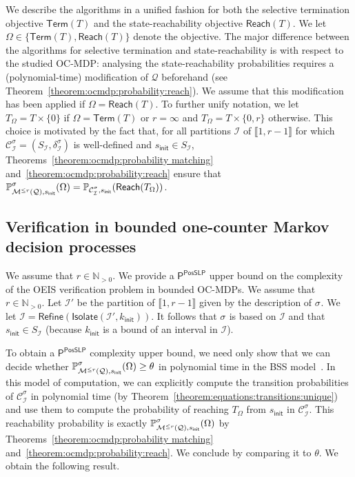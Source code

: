 \documentclass[a4paper,UKenglish,cleveref,autoref,thm-restate,colorlinks]{lipics-v2021}
\newcommand{\init}{\mathsf{init}}
\newcommand{\integerInterval}[1]{\llbracket{}#1\rrbracket{}}
\newcommand{\ptime}{\textsf{P}}
\newcommand{\posSLP}{\textsf{PosSLP}}
\newcommand{\IN}{\mathbb{N}}
\newcommand{\INpos}{\IN_{>0}}
\newcommand{\mdp}{\mathcal{M}}
\newcommand{\mdpStateSpace}{S}
\newcommand{\mdpTrans}{\delta}
\newcommand{\ocmdp}{\mathcal{Q}}
\newcommand{\ocmdpFin}[2]{\mdp^{\leq #2}(#1)}
\newcommand{\ocCount}{k}
\newcommand{\ocConfig}{s}
\newcommand{\counterUB}{r}
\newcommand{\mchain}{\mathcal{C}}
\newcommand{\intPart}{\mathcal{I}}
\newcommand{\compressChainStrat}[1]{\mchain^{#1}_{\intPart}}
\newcommand{\compressChain}{\compressChainStrat{\strat}}
\newcommand{\compressChainStateSpace}{\mdpStateSpace_{\intPart}}
\newcommand{\compressChainTransTemplate}[2]{\mdpTrans^{#1}_{#2}}
\newcommand{\compressChainTrans}{\compressChainTransTemplate{\strat}{\intPart}}
\newcommand{\objective}{\Omega}
\newcommand{\reach}[1]{\mathsf{Reach}(#1)}
\newcommand{\target}{T}
\newcommand{\termination}{\mathsf{Term}}
\newcommand{\selectiveTermination}[1]{\termination({#1})}
\newcommand{\thresProba}{\theta}
\newcommand{\stratGeneric}[1]{{\sigma_{#1}}}
\newcommand{\strat}{\stratGeneric{}}
\begin{document}
We describe the algorithms in a unified fashion for both the selective termination objective $\selectiveTermination{\target}$ and the state-reachability objective $\reach{\target}$.
We let $\objective\in\{\selectiveTermination{\target}, \reach{\target}\}$ denote the objective.
The major difference between the algorithms for selective termination and state-reachability is with respect to the studied OC-MDP: analysing the state-reachability probabilities requires a (polynomial-time) modification of $\ocmdp$ beforehand (see Theorem~\ref{theorem:ocmdp:probability:reach}).
We assume that this modification has been applied if $\objective=\reach{\target}$.
To further unify notation, we let $\target_\objective = \target\times\{0\}$ if $\objective=\selectiveTermination{\target}$ or $\counterUB=\infty$ and $\target_\objective=\target\times\{0, \counterUB\}$ otherwise.
This choice is motivated by the fact that, for all partitions $\intPart$ of $\integerInterval{1, \counterUB-1}$ for which $\compressChain=(\compressChainStateSpace, \compressChainTrans)$ is well-defined and $\ocConfig_\init\in\compressChainStateSpace$, Theorems~\ref{theorem:ocmdp:probability matching} and~\ref{theorem:ocmdp:probability:reach} ensure that $\probaGverb{\ocmdpFin{\ocmdp}{\counterUB}}{\ocConfig_\init}{\strat}(\objective)=\probaMCverb{\compressChain}{\ocConfig_\init}(\reach{\target_\objective})$.

\subsection{Verification in bounded one-counter Markov decision processes}\label{section:verification:algorithms:bounded}
We assume that $\counterUB\in\INpos$.
We provide a $\ptime^{\posSLP}$ upper bound on the complexity of the OEIS verification problem in bounded OC-MDPs.
We assume that $\counterUB\in\INpos$.
Let $\intPart'$ be the partition of $\integerInterval{1, \counterUB-1}$ given by the description of $\strat$.
We let $\intPart = \mathsf{Refine}(\mathsf{Isolate}(\intPart', \ocCount_\init))$.
It follows that $\strat$ is based on $\intPart$ and that $\ocConfig_\init\in\compressChainStateSpace$ (because $\ocCount_\init$ is a bound of an interval in $\intPart$).

To obtain a $\ptime^{\posSLP}$ complexity upper bound, we need only show that we can decide whether $\probaGverb{\ocmdpFin{\ocmdp}{\counterUB}}{\ocConfig_\init}{\strat}(\objective)\geq\thresProba$ in polynomial time in the BSS model~\cite{DBLP:journals/siamcomp/AllenderBKM09}.
In this model of computation, we can explicitly compute the transition probabilities of $\compressChain$ in polynomial time (by Theorem~\ref{theorem:equations:transitions:unique}) and use them to compute the probability of reaching $\target_\objective$ from $\ocConfig_\init$ in $\compressChain$.
This reachability probability is exactly $\probaGverb{\ocmdpFin{\ocmdp}{\counterUB}}{\ocConfig_\init}{\strat}(\objective)$ by Theorems~\ref{theorem:ocmdp:probability matching} and~\ref{theorem:ocmdp:probability:reach}.
We conclude by comparing it to $\thresProba$.
We obtain the following result.
\end{document}
